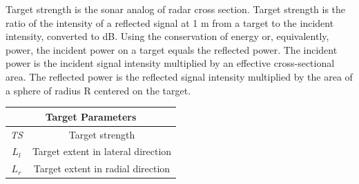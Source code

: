 \noindent Target strength is the sonar analog of radar cross section. Target strength is the ratio of the intensity of a reflected signal at 1 m from a target to the incident intensity, converted to dB. Using the conservation of energy or, equivalently, power, the incident power on a target equals the reflected power. The incident power is the incident signal intensity multiplied by an effective cross-sectional area. The reflected power is the reflected signal intensity multiplied by the area of a sphere of radius R centered on the target. 
\begin{center}
\begin{tabular}{ |c|c| } 
 \hline
 \multicolumn{2}{|c|}{Target Parameters} \\
 \hline
  \textit{TS} & Target strength  \\ 
  \textit{$L_l$} & Target extent in lateral direction \\ 
  \textit{$L_r$} & Target extent in radial direction \\ 
  \hline
\end{tabular}
\end{center}

